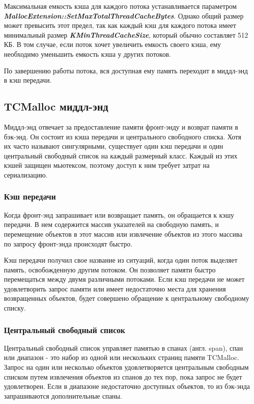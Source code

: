 Максимальная емкость кэша для каждого потока устанавливается параметром \textbf{\textit{MallocExtension::SetMaxTotalThreadCacheBytes}}. Однако общий размер может превысить этот предел, так как каждый кэш для каждого потока имеет минимальный размер \textbf{\textit{KMinThreadCacheSize}}, который обычно составляет 512 КБ. В том случае, если поток хочет увеличить емкость своего кэша, ему необходимо уменьшить емкость кэша у других потоков.

По завершению работы потока, вся доступная ему память переходит в миддл-энд в кэш передачи.

\subsection{TCMalloc миддл-энд}

Миддл-энд отвечает за предоставление памяти фронт-энду и возврат памяти в бэк-энд. Он состоит из кэша передачи и центрального свободного списка. Хотя их часто называют сингулярными, существует один кэш передачи и один центральный свободный список на каждый размерный класс. Каждый из этих кэшей защищен мьютексом, поэтому доступ к ним требует затрат на сериализацию.

\subsubsection{Кэш передачи}

Когда фронт-энд запрашивает или возвращает память, он обращается к кэшу передачи. В нем содержится массив указателей на свободную память, и перемещение объектов в этот массив или извлечение объектов из этого массива по запросу фронт-энда происходят быстро.

Кэш передачи получил свое название из ситуаций, когда один поток выделяет память, освобожденную другим потоком. Он позволяет памяти быстро перемещаться между двумя различными потоками. Если кэш передачи не может удовлетворить запрос памяти или имеет недостаточно места для хранения возвращенных объектов, будет совершено обращение к центральному свободному списку.

\subsubsection{Центральный свободный список}

Центральный свободный список управляет памятью в спанах (англ. span), спан или диапазон - это набор из одной или нескольких страниц памяти TCMalloc. Запрос на один или несколько объектов удовлетворяется центральным свободным списком путем извлечения объектов из спанов до тех пор, пока запрос не будет удовлетворен. Если в диапазоне недостаточно доступных объектов, то из бэк-энда запрашиваются дополнительные спаны.

